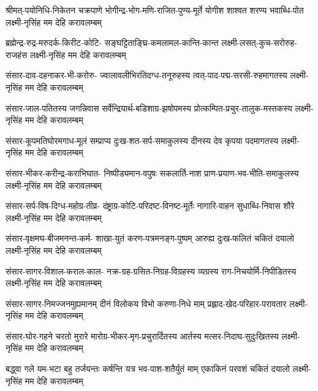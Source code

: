 


\fourlineindentedshloka
{श्रीमत्-पयोनिधि-निकेतन चक्रपाणे}
{भोगीन्द्र-भोग-मणि-राजित-पुण्य-मूर्ते}
{योगीश शाश्वत शरण्य भवाब्धि-पोत}
{लक्ष्मी-नृसिंह मम देहि करावलम्बम्}

\fourlineindentedshloka
{ब्रह्मेन्द्र-रुद्र-मरुदर्क-किरीट-कोटि-}
{सङ्घट्टिताङ्घ्रि-कमलामल-कान्ति-कान्त}
{लक्ष्मी-लसत्-कुच-सरोरुह-राजहंस}
{लक्ष्मी-नृसिंह मम देहि करावलम्बम्}

\fourlineindentedshloka
{संसार-दाव-दहनाकर-भी-करोरु-}
{ज्वालावलीभिरतिदग्ध-तनूरुहस्य}
{त्वत्-पाद-पद्म-सरसी-रुहमागतस्य}
{लक्ष्मी-नृसिंह मम देहि करावलम्बम्}

\fourlineindentedshloka
{संसार-जाल-पतितस्य जगन्निवास}
{सर्वेन्द्रियार्थ-बडिशाग्र-झषोपमस्य}
{प्रोत्कम्पित-प्रचुर-तालुक-मस्तकस्य}
{लक्ष्मी-नृसिंह मम देहि करावलम्बम्}

\fourlineindentedshloka
{संसार-कूपमतिघोरमगाध-मूलं}
{सम्प्राप्य दुःख-शत-सर्प-समाकुलस्य}
{दीनस्य देव कृपया पदमागतस्य}
{लक्ष्मी-नृसिंह मम देहि करावलम्बम्}

\fourlineindentedshloka
{संसार-भीकर-करीन्द्र-कराभिघात-}
{निष्पीड्यमान-वपुषः सकलार्ति-नाश}
{प्राण-प्रयाण-भव-भीति-समाकुलस्य}
{लक्ष्मी-नृसिंह मम देहि करावलम्बम्}

\fourlineindentedshloka
{संसार-सर्प-विष-दिग्ध-महोग्र-तीव्र-}
{दंष्ट्राग्र-कोटि-परिदष्ट-विनष्ट-मूर्तेः}
{नागारि-वाहन सुधाब्धि-निवास शौरे}
{लक्ष्मी-नृसिंह मम देहि करावलम्बम्}

\fourlineindentedshloka
{संसार-वृक्षमघ-बीजमनन्त-कर्म-}
{शाखा-युतं करण-पत्रमनङ्ग-पुष्पम्}
{आरुह्य दुःख-फलितं चकितं दयालो}
{लक्ष्मी-नृसिंह मम देहि करावलम्बम्}

\fourlineindentedshloka
{संसार-सागर-विशाल-कराल-काल-}
{नक्र-ग्रह-ग्रसित-निग्रह-विग्रहस्य}
{व्यग्रस्य राग-निचयोर्मि-निपीडितस्य}
{लक्ष्मी-नृसिंह मम देहि करावलम्बम्}

\fourlineindentedshloka
{संसार-सागर-निमज्जनमुह्यमानम्}
{दीनं विलोकय विभो करुणा-निधे माम्}
{प्रह्लाद-खेद-परिहार-परावतार}
{लक्ष्मी-नृसिंह मम देहि करावलम्बम्}

\fourlineindentedshloka
{संसार-घोर-गहने चरतो मुरारे}
{मारोग्र-भीकर-मृग-प्रचुरार्दितस्य}
{आर्तस्य मत्सर-निदाघ-सुदुःखितस्य}
{लक्ष्मी-नृसिंह मम देहि करावलम्बम्}

\fourlineindentedshloka
{बद्ध्वा गले यम-भटा बहु तर्जयन्तः}
{कर्षन्ति यत्र भव-पाश-शतैर्युतं माम्}
{एकाकिनं परवशं चकितं दयालो}
{लक्ष्मी-नृसिंह मम देहि करावलम्बम्}

